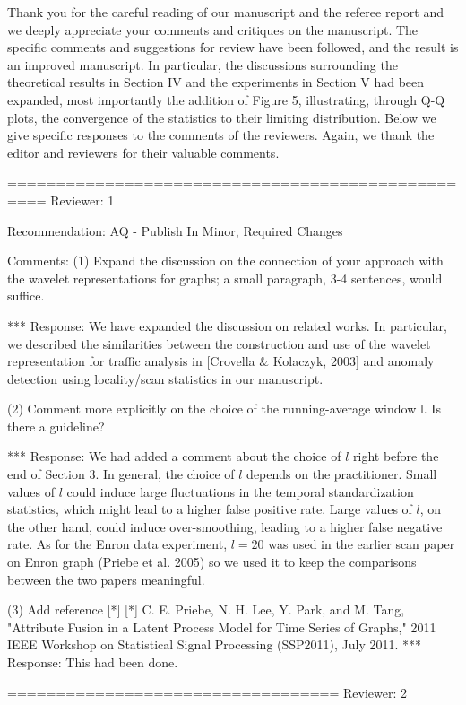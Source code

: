 Thank you for the careful reading of our manuscript and the referee
report and we deeply appreciate your comments and critiques on the
manuscript. The specific comments and suggestions for review have been
followed, and the result is an improved manuscript. In particular,
the discussions surrounding the theoretical results in Section IV and
the experiments in Section V had been expanded, most importantly the
addition of Figure 5, illustrating, through Q-Q plots, 
the convergence of the statistics to their limiting distribution. Below we
give specific responses to the comments of the reviewers.  Again, we
thank the editor and reviewers for their valuable comments.

==================================================
Reviewer: 1

Recommendation: AQ - Publish In Minor, Required Changes

Comments:
(1) Expand the discussion on the connection of your approach with the
wavelet representations for graphs; a small paragraph, 3-4 sentences,
would suffice.

*** Response: 
We have expanded the discussion on related works. In
particular, we described the similarities between the construction and
use of the wavelet representation for traffic analysis in [Crovella & Kolaczyk, 2003] and
anomaly detection using locality/scan statistics in our manuscript.

(2) Comment more explicitly on the choice of the running-average window l. Is there a guideline?  

*** Response: 
We had added a comment about the choice of $l$ right before
the end of Section 3. In general, the choice of $l$ depends on the
practitioner. Small values of $l$ could
induce large fluctuations in the temporal standardization statistics,
which might lead to a higher false positive rate. Large values of $l$,
on the other hand, could induce over-smoothing, leading to a higher
false negative rate. As for the Enron data
experiment, $l = 20$ was used in the earlier scan paper on Enron graph
(Priebe et al. 2005) so we used it to keep the comparisons between the
two papers meaningful. 

(3) Add reference [*] [*] C. E. Priebe, N. H. Lee, Y. Park, and
M. Tang, "Attribute Fusion in a Latent Process Model for Time Series
of Graphs," 2011 IEEE Workshop on Statistical Signal Processing
(SSP2011), July 2011.
*** Response: This had been done.

==================================
Reviewer: 2

